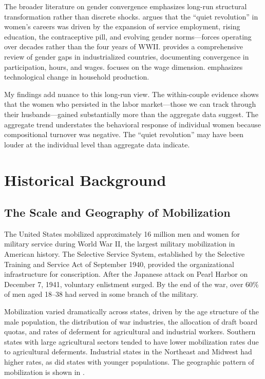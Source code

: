 \documentclass[12pt]{article}
\begin{document}
The broader literature on gender convergence emphasizes long-run structural transformation rather than discrete shocks. \citet{goldin2006quiet} argues that the ``quiet revolution'' in women's careers was driven by the expansion of service employment, rising education, the contraceptive pill, and evolving gender norms---forces operating over decades rather than the four years of WWII. \citet{olivetti2016evolution} provides a comprehensive review of gender gaps in industrialized countries, documenting convergence in participation, hours, and wages. \citet{blau2017gender} focuses on the wage dimension. \citet{greenwood2005engines} emphasizes technological change in household production.

My findings add nuance to this long-run view. The within-couple evidence shows that the women who persisted in the labor market---those we can track through their husbands---gained substantially more than the aggregate data suggest. The aggregate trend understates the behavioral response of individual women because compositional turnover was negative. The ``quiet revolution'' may have been louder at the individual level than aggregate data indicate.



\section{Historical Background}
\label{sec:background}

\subsection{The Scale and Geography of Mobilization}

The United States mobilized approximately 16 million men and women for military service during World War II, the largest military mobilization in American history. The Selective Service System, established by the Selective Training and Service Act of September 1940, provided the organizational infrastructure for conscription. After the Japanese attack on Pearl Harbor on December 7, 1941, voluntary enlistment surged. By the end of the war, over 60\% of men aged 18--38 had served in some branch of the military.

Mobilization varied dramatically across states, driven by the age structure of the male population, the distribution of war industries, the allocation of draft board quotas, and rates of deferment for agricultural and industrial workers. Southern states with large agricultural sectors tended to have lower mobilization rates due to agricultural deferments. Industrial states in the Northeast and Midwest had higher rates, as did states with younger populations. The geographic pattern of mobilization is shown in .
\end{document}
